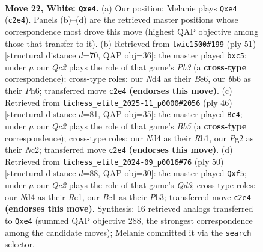 \documentclass[11pt]{article}
\begin{document}
\clearpage

\begin{figure}[p]\centering
\begin{subfigure}{0.46\textwidth}\centering
\resizebox{\linewidth}{!}{%
\newchessgame
\chessboard[
  setfen={rq6/2p2kpp/1b1p4/8/pP1Nb1n1/2P5/P1Q2PPP/1RB2K2 w - - 0 22},
  showmover=false,
  pgfstyle=straightmove, color=movearrow, markmove={c2-e4}
]}
\caption{}
\end{subfigure}\hfill
\begin{subfigure}{0.46\textwidth}\centering
\resizebox{\linewidth}{!}{%
\newchessgame
\chessboard[
  setfen={2r3k1/1pq2pp1/1p2b2p/2B1N3/1n5P/5BP1/1P1QPP2/3R2K1 b - - 0 26},
  showmover=false,
  pgfstyle=straightmove, color=movearrow, markmove={b6-c5}
]}
\caption{}
\end{subfigure}
\\[4pt]
\begin{subfigure}{0.46\textwidth}\centering
\resizebox{\linewidth}{!}{%
\newchessgame
\chessboard[
  setfen={3r2k1/3p1ppp/2b1p3/qBP1P1b1/3P4/3Q1P2/2N3PP/1R4K1 w - - 5 24},
  showmover=false,
  pgfstyle=straightmove, color=movearrow, markmove={b5-c4}
]}
\caption{}
\end{subfigure}\hfill
\begin{subfigure}{0.46\textwidth}\centering
\resizebox{\linewidth}{!}{%
\newchessgame
\chessboard[
  setfen={3r2k1/1pq2pp1/p4b1p/5b2/2Pp4/1P1Q1BP1/P4P2/4RK2 w - - 0 26},
  showmover=false,
  pgfstyle=straightmove, color=movearrow, markmove={d3-f5}
]}
\caption{}
\end{subfigure}
\caption{\textbf{Move 22, White: \texttt{Qxe4}.} (a) Our position; Melanie plays \texttt{Qxe4} (\texttt{c2e4}). Panels (b)--(d) are the retrieved master positions whose correspondence most drove this move (highest QAP objective among those that transfer to it). (b) Retrieved from \texttt{twic1500\#199} (ply 51) [structural distance $d$=70, QAP obj=36]: the master played \texttt{bxc5}; under $\mu$ our \emph{Qc2} plays the role of that game's \emph{Pb3} (a \textbf{cross-type} correspondence); cross-type roles: our \emph{N}d4 as their \emph{B}e6, our \emph{b}b6 as their \emph{P}h6; transferred move \texttt{c2e4} \textbf{(endorses this move)}. (c) Retrieved from \texttt{lichess\_elite\_2025-11\_p0000\#2056} (ply 46) [structural distance $d$=81, QAP obj=35]: the master played \texttt{Bc4}; under $\mu$ our \emph{Qc2} plays the role of that game's \emph{Bb5} (a \textbf{cross-type} correspondence); cross-type roles: our \emph{N}d4 as their \emph{R}b1, our \emph{P}g2 as their \emph{N}c2; transferred move \texttt{c2e4} \textbf{(endorses this move)}. (d) Retrieved from \texttt{lichess\_elite\_2024-09\_p0016\#76} (ply 50) [structural distance $d$=88, QAP obj=30]: the master played \texttt{Qxf5}; under $\mu$ our \emph{Qc2} plays the role of that game's \emph{Qd3}; cross-type roles: our \emph{N}d4 as their \emph{R}e1, our \emph{B}c1 as their \emph{P}b3; transferred move \texttt{c2e4} \textbf{(endorses this move)}. Synthesis: 16 retrieved analogs transferred to \texttt{Qxe4} (summed QAP objective 288, the strongest correspondence among the candidate moves); Melanie committed it via the \texttt{search} selector.}
\label{fig:thought-m42}
\end{figure}
\end{document}

